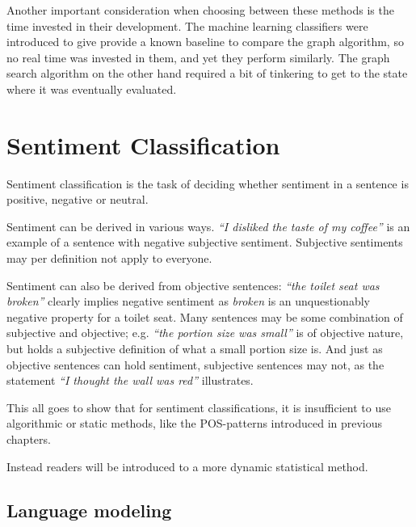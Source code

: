 \documentclass[a4paper,11pt]{kth-mag}
\begin{document}
Another important consideration when choosing between these methods is the time invested in their development.
The machine learning classifiers were introduced to give provide a known baseline to compare the graph algorithm,
so no real time was invested in them, and yet they perform similarly. The graph search algorithm on the other hand
required a bit of tinkering to get to the state where it was eventually evaluated.



\chapter{Sentiment Classification}
\label{sec:sentiment_classification}
Sentiment classification is the task of deciding whether sentiment in a sentence
is positive, negative or neutral\cite{nlp_book}.


Sentiment can be derived in various ways. \emph{``I disliked the taste of my coffee''}
is an example of a sentence with negative subjective sentiment.
Subjective sentiments may per definition not apply to everyone.

Sentiment can also be derived from objective sentences:
\emph{``the toilet seat was broken''} clearly implies negative sentiment
as \emph{broken} is an unquestionably negative property for a toilet seat.
Many sentences may be some combination of subjective and objective;
e.g. \emph{``the portion size was small''} is of objective nature,
but holds a subjective definition of what a small portion size is.
And just as objective sentences can hold sentiment, subjective sentences may not, as
the statement \emph{``I thought the wall was red''} illustrates.

This all goes to show that for sentiment classifications, it is insufficient
to use algorithmic or static methods, like the POS-patterns introduced in previous
chapters.

Instead readers will be introduced to a more dynamic statistical method.

\section{Language modeling}
\end{document}
